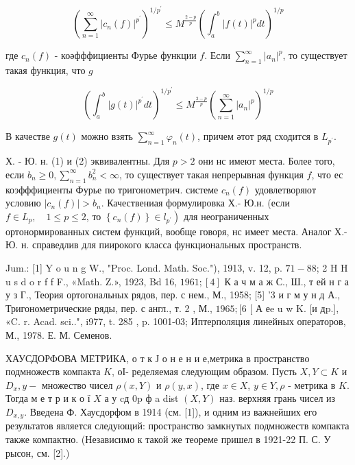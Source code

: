 \documentclass[10pt]{article}
\begin{document}
\[

\left(\sum_{n=1}^{\infty}\left|c_{n}(f)\right|^{p^{\prime}}\right)^{1 / p^{\prime}} \leqslant M^{\frac{2-p}{p}}\left(\int_{a}^{b}|f(t)|^{p} d t\right)^{1 / p}

\]



где $c_{n}(f)$ - коәфффициенты Фурье функции $f$. Если $\sum_{n=1}^{\infty}\left|a_{n}\right|^{p}$, то существует такая функция, что $g$



\[

\left(\int_{a}^{b}|g(t)|^{p^{\prime}} d t\right)^{1 / p^{\prime}} \leqslant M^{\frac{2-p}{p}}\left(\sum_{n=1}^{\infty}\left|a_{n}\right|^{p}\right)^{1 / p}

\]



В качестве $g(t)$ можно взять $\sum_{n=1}^{\infty} \varphi_{n}(t)$, причем әтот ряд сходится в $L_{p^{\prime}}$.



Х. - Ю. н. (1) и (2) эквивалентны. Для $p>2$ они нс имеют места. Более того, если $b_{n} \geqslant 0, \sum_{n=1}^{\infty} b_{n}^{2}<\infty$, то существует такая непрерывная функция $f$, что ес коэфффициенты Фурье по тригонометрич. системе $c_{n}(f)$ удовлетворяют условию $\left|c_{n}(f)\right|>b_{n}$. Качествениая формулировка Х.- Ю.н. (если $f \in L_{p}, \quad 1 \leqslant p \leqslant 2$, то $\left.\left\{c_{n}(f)\right\} \in l_{p^{\prime}}\right)$ для неограниченных ортонормированных систем функций, вообще говоря, нс имеет места. Аналог Х.- Ю. н. справедлив для пиирокого класса функциональных пространств.



Jum.: [1] Y o u n g W., "Proc. Lond. Math. Soc."), 1913, v. 12, p. $71-88$; 2 H H u s d o r f f F., «Math. Z.», 1923, Bd 16, $1961 ;[4]$ К а ч м а ж С., Ш., т ей н г а у з Г., Теория ортогональных рядов, пер. с нем., М., 1958; [5] '3 и г м у н д А., Тригонометрические ряды, пер. с англ., т. 2 , М., $1965 ;[6$ [ А еe u w K. [и дp.], «C. r. Acad. sci..", i977, t. 285 , p. 1001-03; Иптерполяция линейных операторов, М., 1978. Е. М. Семенов.



ХАУСДОРФОВА МЕТРИКА, о т к Ј о н е н и е,метрика в пространство подмножеств компакта $K$, оІ- ределяемая следующим образом. Пусть $X, Y \subset K$ и $D_{x}, y-$ множество чисел $\rho(x, Y)$ и $\rho(y, x)$, где $x \in X$, $y \in Y, \rho$ - метрика в $K$. Тогда м е т р и к о ї $X$ а у cд $0 \mathrm{p}$ ф a dist $(X, Y)$ наз. верхняя грань чисел из $D_{x, y}$. Введена Ф. Хаусдорфом в 1914 (см. [1]), и одним из важнейших его результатов является следующий: пространство замкнутых подмножеств компакта также компактно. (Независимо к такой же теореме пришел в 1921-22 П. С. У рысон, см. [2].)
\end{document}
